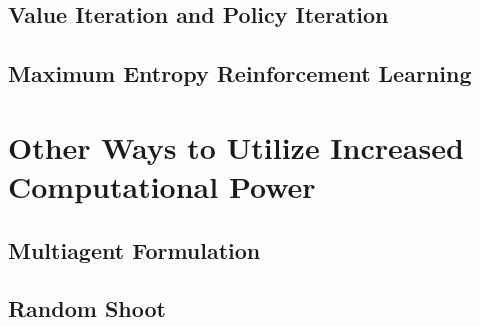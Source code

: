 \documentclass[journal]{IEEEtran}
\begin{document}
\subsection{Value Iteration and Policy Iteration}
\subsection{Maximum Entropy Reinforcement Learning}



\section{Other Ways to Utilize Increased Computational Power}
\subsection{Multiagent Formulation}



\subsection{Random Shoot}





\end{document}
